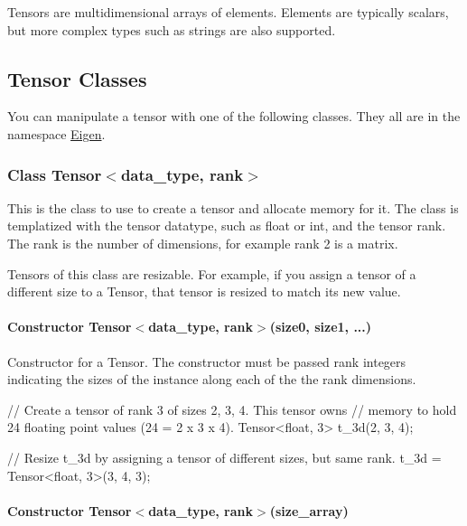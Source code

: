 Tensors are multidimensional arrays of elements. Elements are typically scalars, but more complex types such as strings are also supported.

\subsection*{Tensor Classes}

You can manipulate a tensor with one of the following classes. They all are in the namespace {\ttfamily \hyperlink{namespace_eigen}{Eigen}.}

\subsubsection*{Class Tensor$<$data\+\_\+type, rank$>$}

This is the class to use to create a tensor and allocate memory for it. The class is templatized with the tensor datatype, such as float or int, and the tensor rank. The rank is the number of dimensions, for example rank 2 is a matrix.

Tensors of this class are resizable. For example, if you assign a tensor of a different size to a Tensor, that tensor is resized to match its new value.

\paragraph*{Constructor Tensor$<$data\+\_\+type, rank$>$(size0, size1, ...)}

Constructor for a Tensor. The constructor must be passed {\ttfamily rank} integers indicating the sizes of the instance along each of the the {\ttfamily rank} dimensions. \begin{DoxyVerb}// Create a tensor of rank 3 of sizes 2, 3, 4.  This tensor owns
// memory to hold 24 floating point values (24 = 2 x 3 x 4).
Tensor<float, 3> t_3d(2, 3, 4);

// Resize t_3d by assigning a tensor of different sizes, but same rank.
t_3d = Tensor<float, 3>(3, 4, 3);
\end{DoxyVerb}


\paragraph*{Constructor Tensor$<$data\+\_\+type, rank$>$(size\+\_\+array)}

